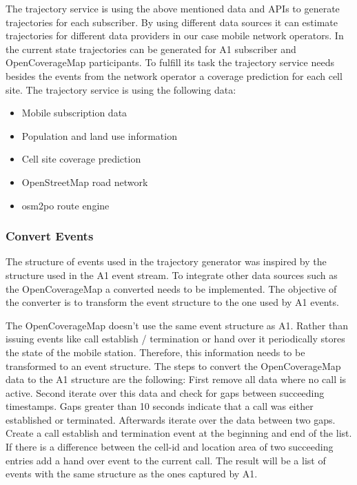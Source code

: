 \documentclass[master,english]{hgbthesis}
\begin{document}
The trajectory service is using the above mentioned data and APIs to generate trajectories for each subscriber. By using different data sources it can estimate trajectories for different data providers in our case mobile network operators. In the current state trajectories can be generated for A1 subscriber and OpenCoverageMap participants. To fulfill its task the trajectory service needs besides the events from the network operator a coverage prediction for each cell site. The trajectory service is using the following data:

\begin{itemize}

\item Mobile subscription data

\item Population and land use information

\item Cell site coverage prediction

\item OpenStreetMap road network

\item osm2po route engine

\end{itemize}

\subsubsection{Convert Events}

The structure of events used in the trajectory generator was inspired by the structure used in the A1 event stream. To integrate other data sources such as the OpenCoverageMap a converted needs to be implemented. The objective of the converter is to transform the event structure to the one used by A1 events.

The OpenCoverageMap doesn't use the same event structure as A1. Rather than issuing events like call establish / termination or hand over it periodically stores the state of the mobile station. Therefore, this information needs to be transformed to an event structure. The steps to convert the OpenCoverageMap data to the A1 structure are the following: First remove all data where no call is active. Second iterate over this data and check for gaps between succeeding timestamps. Gaps greater than 10 seconds indicate that a call was either established or terminated. Afterwards iterate over the data between two gaps. Create a call establish and termination event at the beginning and end of the list. If there is a difference between the cell-id and location area of two succeeding entries add a hand over event to the current call. The result will be a  list of events with the same structure as the ones captured by A1.
\end{document}
